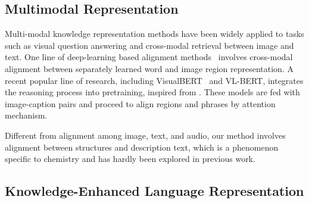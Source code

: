 

\subsection{Multimodal Representation}

Multi-modal knowledge representation methods have been widely applied to tasks such as visual question answering and cross-modal retrieval between image and text. One line of deep-learning based alignment methods~\cite{sim_filter, wei2020multi,ye2019cross, danmm, LiACL2020} involves cross-modal alignment between separately learned word and image region representation. A recent popular line of research, including VisualBERT~\cite{visualbert} and VL-BERT\cite{vlbert}, integrates the reasoning process into pretraining, inspired from \cite{bert}. These models are fed with image-caption pairs and proceed to align regions and phrases by attention mechanism. 

Different from alignment among image, text, and audio, our method involves alignment between structures and description text, which is a phenomenon specific to chemistry and has hardly been explored in previous work. \\  

\subsection{Knowledge-Enhanced Language Representation}

